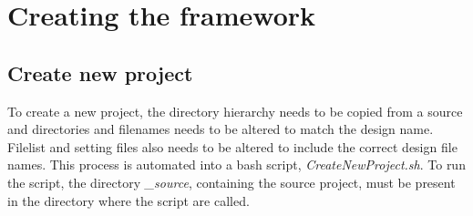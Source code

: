 \chapter{\label{chp:createframework}Creating the framework}
\section{Create new project}
To create a new project, the directory hierarchy needs to be copied from a source and directories and filenames needs to be altered to match the design name. Filelist and setting files also needs to be altered to include the correct design file names. This process is automated into a bash script, \textit{CreateNewProject.sh}. To run the script, the directory \textit{\_source}, containing the source project, must be present in the directory where the script are called.

